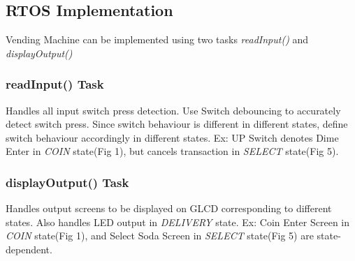 \documentclass{article}
\begin{document}
 \subsection{RTOS Implementation}
 \qquad Vending Machine can be implemented using two tasks \textit{readInput()} and \textit{displayOutput()}
 \subsubsection{readInput() Task}
 \qquad Handles all input switch press detection. Use Switch debouncing to accurately detect switch press. Since switch behaviour is different in different states, define switch behaviour accordingly in different states. Ex: UP Switch denotes Dime Enter in \textit{COIN} state(Fig 1), but cancels transaction in \textit{SELECT} state(Fig 5).
 \subsubsection{displayOutput() Task}
 \qquad Handles output screens to be displayed on GLCD corresponding to different states. Also handles LED output in \textit{DELIVERY} state. Ex: Coin Enter Screen in \textit{COIN} state(Fig 1), and Select Soda Screen in \textit{SELECT} state(Fig 5) are state-dependent.
\end{document}
